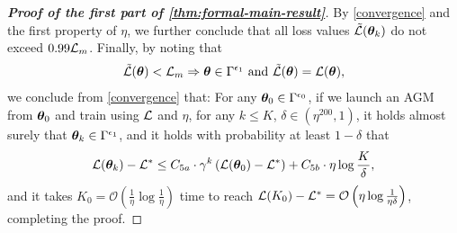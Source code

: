 \begin{proof}[\textbf{Proof of the first part of \cref{thm:formal-main-result}}]
By \cref{convergence} and the first property of $\eta$, we further conclude that all loss values $\tilde{\mathcal{L}}({\bm{\theta}}_k)$ do not exceed $0.99\mathcal{L}_m$. Finally, by noting that \begin{align*}
\tilde{\mathcal{L}}({\bm{\theta}}) < \mathcal{L}_m \Rightarrow {\bm{\theta}} \in \Gamma^{\epsilon_1} \text{  and } \tilde{\mathcal{L}}({\bm{\theta}}) = \mathcal{L}({\bm{\theta}}),  
\end{align*}
we conclude from \cref{convergence} that: For any ${\bm{\theta}}_0 \in \Gamma^{\epsilon_0}$, if we launch an AGM from ${\bm{\theta}}_0$ and train using $\mathcal{L}$ and $\eta$, for any $k \leq K$, $\delta \in (\eta^{200},1)$, it holds almost surely that ${\bm{\theta}}_k \in \Gamma^{\epsilon_1}$, and it holds with probability at least $1-\delta$ that $$\mathcal{L}({\bm{\theta}}_{k})-\mathcal{L}^* \leq C_{5a} \cdot \gamma^k \left(\mathcal{L}({\bm{\theta}}_0) - \mathcal{L}^*\right) + C_{5b} \cdot \eta \log \frac{K}{\delta},$$
and it takes $K_0 = \mathcal{O}(\frac{1}{\eta} \log \frac{1}{\eta})$ time to reach $\mathcal{L}(K_0) - \mathcal{L}^* = \mathcal{O}\left(\eta \log \frac{1}{\eta\delta}\right)$, 
completing the proof.
\end{proof}


